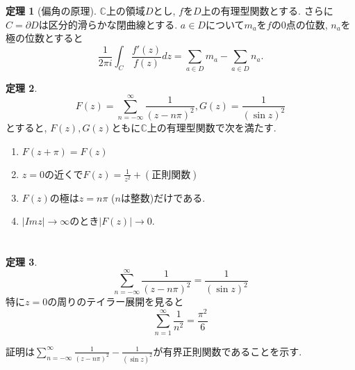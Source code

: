 \documentclass[dvipdfmx,a4paper,11pt]{article}
\newcommand{\C}{\mathbb{C}}
\theoremstyle{definition}
\newtheorem{thm}{定理}
\begin{document}
\begin{tcolorbox}[
    colback = white,
    colframe = green!35!black,
    fonttitle = \bfseries,
    breakable = true]
    \begin{thm}[偏角の原理]
    $\C$上の領域$D$とし, $f$を$D$上の有理型関数とする. さらに$C = \partial D$は区分的滑らかな閉曲線とする.
$a \in D$について$m_a$を$f$の0点の位数, $n_a$を極の位数とすると
    $$
    \frac{1}{2 \pi i}\int_{C} \frac{f'(z)}{f(z)} dz = \sum_{a \in D}m_{a} - \sum_{a \in D}n_{a}. 
     $$
    \end{thm}
\end{tcolorbox} 

\begin{tcolorbox}[
    colback = white,
    colframe = green!35!black,
    fonttitle = \bfseries,
    breakable = true]
    \begin{thm}
    $$
    F(z) = \sum_{n=-\infty}^{\infty} \frac{1}{(z - n \pi)^2}, G(z) =  \frac{1}{(\sin z)^2}
    $$
    とすると, $F(z), G(z)$ともに$\C$上の有理型関数で次を満たす.    
   \begin{enumerate}
   \setlength{\parskip}{0cm} 
  \setlength{\itemsep}{0cm} 
   \item $F(z + \pi)=F(z)$
   \item $z =0$の近くで$F(z) = \frac{1}{z^2} + (\text{正則関数})$
   \item $F(z)$の極は$z=n \pi$ ($n$は整数)だけである.
   \item $|Im z| \rightarrow \infty$のとき$|F(z)| \rightarrow 0$.
   \end{enumerate}
    \end{thm}
\end{tcolorbox} 

\section{}

\begin{tcolorbox}[
    colback = white,
    colframe = green!35!black,
    fonttitle = \bfseries,
    breakable = true]
    \begin{thm}
$$
 \sum_{n=-\infty}^{\infty} \frac{1}{(z - n \pi)^2}  =  \frac{1}{(\sin z)^2}
$$
特に$z=0$の周りのテイラー展開を見ると
$$
 \sum_{n=1}^{\infty} \frac{1}{n^2}  =  \frac{\pi^2}{6}
$$
    \end{thm}
\end{tcolorbox} 
証明は$ \sum_{n=-\infty}^{\infty} \frac{1}{(z - n \pi)^2}  - \frac{1}{(\sin z)^2}$が有界正則関数であることを示す.
\end{document}
